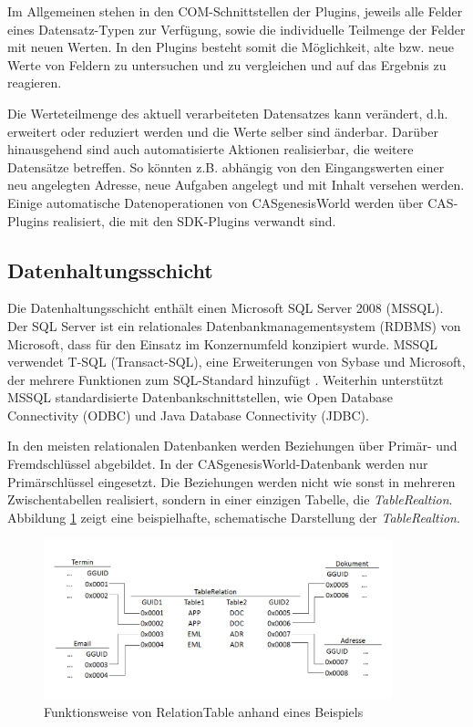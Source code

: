 Im Allgemeinen stehen in den COM-Schnittstellen der Plugins, jeweils alle Felder eines Datensatz-Typen zur Verfügung, sowie die individuelle Teilmenge der Felder mit neuen Werten. In den Plugins besteht somit die Möglichkeit, alte bzw. neue Werte von Feldern zu untersuchen und zu vergleichen und auf das Ergebnis zu reagieren.

Die Werteteilmenge des aktuell verarbeiteten Datensatzes kann verändert, d.h. erweitert oder reduziert werden und die Werte selber sind änderbar. Darüber hinausgehend sind auch automatisierte Aktionen realisierbar, die weitere Datensätze betreffen. So könnten z.B. abhängig von den Eingangswerten einer neu angelegten Adresse, neue Aufgaben angelegt und mit Inhalt versehen werden. Einige automatische Datenoperationen von CASgenesisWorld werden über CAS-Plugins realisiert, die mit den SDK-Plugins verwandt sind.

\subsection{Datenhaltungsschicht}
\label{ch:Systemanalyse:sec:genesisWorld:subsec:db}

Die Datenhaltungsschicht enthält einen Microsoft SQL Server 2008 (MSSQL). Der SQL Server ist ein relationales Datenbankmanagementsystem (RDBMS) von Microsoft, dass für den Einsatz im Konzernumfeld konzipiert wurde. MSSQL verwendet T-SQL (Transact-SQL), eine Erweiterungen von Sybase und Microsoft, der mehrere Funktionen zum SQL-Standard hinzufügt \cite{tech2013}. Weiterhin unterstützt MSSQL standardisierte Datenbankschnittstellen, wie Open Database Connectivity (ODBC) und Java Database Connectivity (JDBC).
  
In den meisten relationalen Datenbanken werden Beziehungen über Primär- und Fremdschlüssel abgebildet. In der CASgenesisWorld-Datenbank werden nur Primärschlüssel eingesetzt. Die Beziehungen werden nicht wie sonst in mehreren Zwischentabellen realisiert, sondern in einer einzigen Tabelle, die \textit{TableRealtion}. Abbildung \ref{gw_2} zeigt eine beispielhafte, schematische Darstellung der \textit{TableRealtion}.

\begin{figure}[ht]
	\centering
  \includegraphics[width=0.9\textwidth, width=0.9\textwidth]{pics/gW_tablerealtion.png}
	\caption{Funktionsweise von RelationTable anhand eines Beispiels}
	\label{gw_2}
\end{figure}

